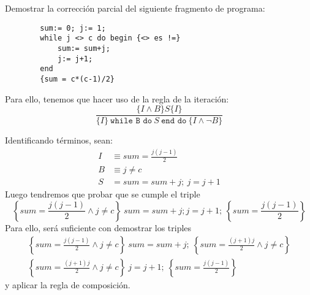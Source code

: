 \begin{ejercicio}
    Demostrar la corrección parcial del siguiente fragmento de programa:
    \begin{verbatim}
        sum:= 0; j:= 1;
        while j <> c do begin {<> es !=}
            sum:= sum+j;
            j:= j+1;
        end
        {sum = c*(c-1)/2}
    \end{verbatim}

    Para ello, tenemos que hacer uso de la regla de la iteración: 
    \begin{equation*}
        \dfrac{\{I\land B\}S\{I\}}{\{I\}\ \texttt{while B do}\ S\ \texttt{end do}\ \{I\land \lnot B\}}
    \end{equation*}

    Identificando términos, sean:
    \begin{align*}
        I &\equiv sum = \frac{j(j-1)}{2} \\
        B &\equiv j \neq c \\
        S &= sum = sum+j;\ j = j+1
    \end{align*}
    Luego tendremos que probar que se cumple el triple
    \begin{equation*}
        \left\{sum=\frac{j(j-1)}{2} \land j\neq c\right\}\ sum=sum+j;j=j+1;\ \left\{sum=\frac{j(j-1)}{2}\right\}
    \end{equation*}
    Para ello, será suficiente con demostrar los triples
    \begin{gather*}
        \left\{sum = \frac{j(j-1)}{2} \land j\neq c\right\}\ sum = sum + j;\ \left\{sum = \frac{(j+1)j}{2} \land j \neq c\right\} \\
        \left\{sum = \frac{(j+1)j}{2} \land j\neq c\right\}\ j=j+1;\ \left\{sum = \frac{j(j-1)}{2}\right\}
    \end{gather*}
    y aplicar la regla de composición.


\end{ejercicio}
